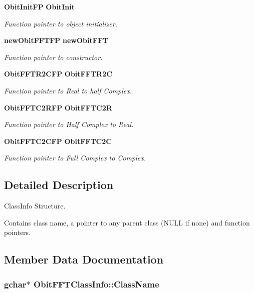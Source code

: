 \begin{CompactItemize}
{\bf Obit\-Init\-FP} {\bf Obit\-Init}
\begin{CompactList}\small\item\em Function pointer to object initializer. \item\end{CompactList}\item 
{\bf new\-Obit\-FFTFP} {\bf new\-Obit\-FFT}
\begin{CompactList}\small\item\em Function pointer to constructor. \item\end{CompactList}\item 
{\bf Obit\-FFTR2CFP} {\bf Obit\-FFTR2C}
\begin{CompactList}\small\item\em Function pointer to Real to half Complex.. \item\end{CompactList}\item 
{\bf Obit\-FFTC2RFP} {\bf Obit\-FFTC2R}
\begin{CompactList}\small\item\em Function pointer to Half Complex to Real. \item\end{CompactList}\item 
{\bf Obit\-FFTC2CFP} {\bf Obit\-FFTC2C}
\begin{CompactList}\small\item\em Function pointer to Full Complex to Complex. \item\end{CompactList}\end{CompactItemize}


\subsection{Detailed Description}
Class\-Info Structure. 

Contains class name, a pointer to any parent class (NULL if none) and function pointers. 



\subsection{Member Data Documentation}
\subsubsection{\setlength{\rightskip}{0pt plus 5cm}gchar$\ast$ {\bf Obit\-FFTClass\-Info::Class\-Name}}\label{structObitFFTClassInfo_o2}



